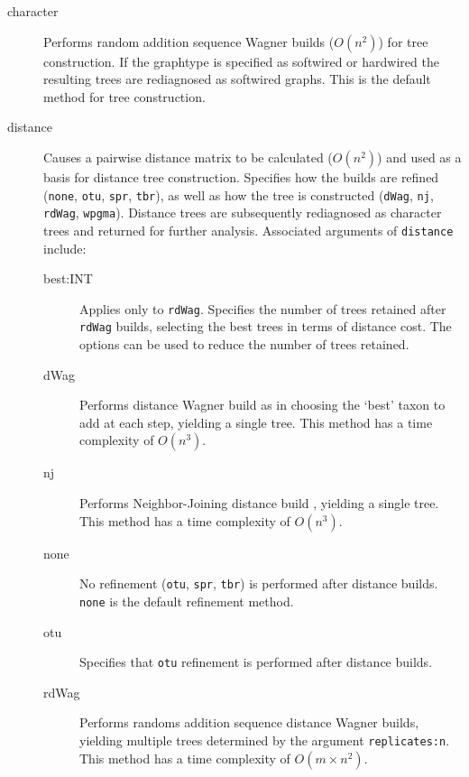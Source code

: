 \begin{description}
		\item [character] Performs random addition sequence Wagner \citep{Farris1970} builds 
		($O(n^2)$) for tree construction. If the graphtype is specified as softwired or hardwired 
		the resulting trees are rediagnosed as softwired graphs. This is 
		the default method for tree construction.
		
		\item [distance] Causes a pairwise distance matrix to be calculated ($O(n^2)$) and used 
		as a basis for distance tree construction. Specifies how the builds are refined (\texttt{none}, 
		\texttt{otu}, \texttt{spr}, \texttt{tbr}), as well as how the tree is constructed (\texttt{dWag}, 
		\texttt{nj}, \texttt{rdWag}, \texttt{wpgma}). Distance trees are subsequently rediagnosed 
		as character trees and returned for further analysis. Associated arguments of \texttt{distance} 
		include:
					
		\begin{description}
			\item[best:INT] Applies only to \texttt{rdWag}. Specifies the number of trees retained 
			after 	\texttt{rdWag} builds, selecting the best trees in terms of distance cost. The 
			options can be used to reduce the number of trees retained.  
						
			\item[dWag] Performs distance Wagner build as in \citep{Farris1972} choosing the 
			`best' taxon to 
			add at each step, yielding a single tree. This method has a time complexity of $O(n^3)$.

			\item[nj] Performs Neighbor-Joining distance build \citep{Saitou1987}, yielding a single 
			tree. This method has a time complexity of $O(n^3)$.

			\item[none] No refinement (\texttt{otu}, \texttt{spr}, \texttt{tbr}) is performed after 
			distance builds. \texttt{none} is the default refinement method.
						
			\item[otu] Specifies that \texttt{otu} refinement \citep{Wheeler2021} is performed 
			after distance builds.
			
			\item[rdWag] Performs randoms addition sequence distance Wagner builds, 
			yielding multiple trees determined by the argument \texttt{replicates:n}. This 
			method has a time complexity of $O(m \times n^2)$.
			

\end{description}
\end{description}
